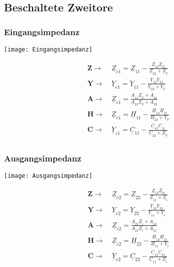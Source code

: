 \subsection{Beschaltete Zweitore}
\subsubsection{Eingangsimpedanz}
\centering\texttt{[image: Eingangsimpedanz]}
\begin{mdframed}[style=exercise]
    \begin{align*}
        \boldsymbol{Z}\rightarrow&\  \underline{Z}_{e1} = \underline{Z}_{11}-\frac{\underline{Z}_{12}\underline{Z}_{21}}{\underline{Z}_{22}+\underline{Z}_V}\\
        \boldsymbol{Y}\rightarrow&\  \underline{Y}_{e1} = \underline{Y}_{11}-\frac{\underline{Y}_{12}\underline{Y}_{21}}{\underline{Y}_{22}+\underline{Y}_V}\\
        \boldsymbol{A}\rightarrow&\  \underline{Z}_{e1} = \frac{\underline{A}_{11}\underline{Z}_V + \underline{A}_{12}}{\underline{A}_{21}\underline{Z}_V+\underline{A}_{22}}\\
        \boldsymbol{H}\rightarrow&\  \underline{Z}_{e1} = \underline{H}_{11}-\frac{\underline{H}_{12}\underline{H}_{21}}{\underline{H}_{22}+\underline{Y}_V}\\
        \boldsymbol{C}\rightarrow&\  \underline{Y}_{e1} = \underline{C}_{11}-\frac{\underline{C}_{12}\underline{C}_{21}}{\underline{C}_{22}+\underline{Z}_V}\\
    \end{align*}
\end{mdframed}
\raggedright

\subsubsection{Ausgangsimpedanz}
\centering\texttt{[image: Ausgangsimpedanz]}
\begin{mdframed}[style=exercise]
    \begin{align*}
        \boldsymbol{Z}\rightarrow&\  \underline{Z}_{e2} = \underline{Z}_{22}-\frac{\underline{Z}_{12}\underline{Z}_{21}}{\underline{Z}_{11}+\underline{Z}_i}\\
        \boldsymbol{Y}\rightarrow&\  \underline{Y}_{e2} = \underline{Y}_{22}-\frac{\underline{Y}_{12}\underline{Y}_{21}}{\underline{Y}_{11}+\underline{Y}_i}\\
        \boldsymbol{A}\rightarrow&\  \underline{Z}_{e2} = \frac{\underline{A}_{22}\underline{Z}_i + \underline{A}_{12}}{\underline{A}_{21}\underline{Z}_i+\underline{A}_{11}}\\
        \boldsymbol{H}\rightarrow&\  \underline{Z}_{e2} = \underline{H}_{22}-\frac{\underline{H}_{12}\underline{H}_{21}}{\underline{H}_{11}+\underline{Y}_i}\\
        \boldsymbol{C}\rightarrow&\  \underline{Y}_{e2} = \underline{C}_{22}-\frac{\underline{C}_{12}\underline{C}_{21}}{\underline{C}_{11}+\underline{Z}_i}\\
    \end{align*}
\end{mdframed}
\raggedright

